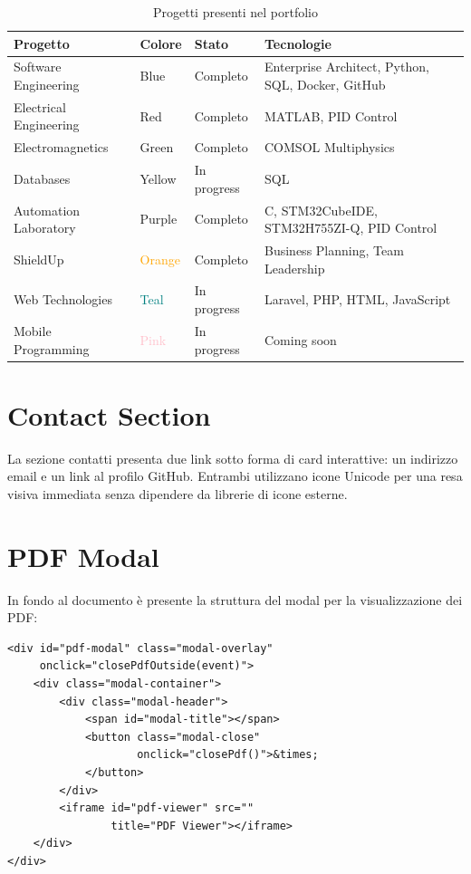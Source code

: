 \documentclass[a4paper,12pt]{report}
\begin{document}
\begin{table}[H]
\centering
\caption{Progetti presenti nel portfolio}
\begin{tabularx}{\textwidth}{l l l X}
\toprule
\textbf{Progetto} & \textbf{Colore} & \textbf{Stato} & \textbf{Tecnologie} \\
\midrule
Software Engineering & \textcolor{googleblue}{Blue} & Completo & Enterprise Architect, Python, SQL, Docker, GitHub \\
Electrical Engineering & \textcolor{googlered}{Red} & Completo & MATLAB, PID Control \\
Electromagnetics & \textcolor{googlegreen}{Green} & Completo & COMSOL Multiphysics \\
Databases & \textcolor{googleyellow}{Yellow} & In progress & SQL \\
Automation Laboratory & \textcolor{googlepurple}{Purple} & Completo & C, STM32CubeIDE, STM32H755ZI-Q, PID Control \\
ShieldUp & \textcolor{orange}{Orange} & Completo & Business Planning, Team Leadership \\
Web Technologies & \textcolor{teal}{Teal} & In progress & Laravel, PHP, HTML, JavaScript \\
Mobile Programming & \textcolor{pink}{Pink} & In progress & Coming soon \\
\bottomrule
\end{tabularx}
\end{table}

\section{Contact Section}

La sezione contatti presenta due link sotto forma di card interattive: un indirizzo email e un link al profilo GitHub. Entrambi utilizzano icone Unicode per una resa visiva immediata senza dipendere da librerie di icone esterne.

\section{PDF Modal}

In fondo al documento \`e presente la struttura del modal per la visualizzazione dei PDF:

\begin{lstlisting}[style=htmlstyle, caption={Struttura del PDF Modal}]
<div id="pdf-modal" class="modal-overlay"
     onclick="closePdfOutside(event)">
    <div class="modal-container">
        <div class="modal-header">
            <span id="modal-title"></span>
            <button class="modal-close"
                    onclick="closePdf()">&times;
            </button>
        </div>
        <iframe id="pdf-viewer" src=""
                title="PDF Viewer"></iframe>
    </div>
</div>
\end{lstlisting}
\end{document}
